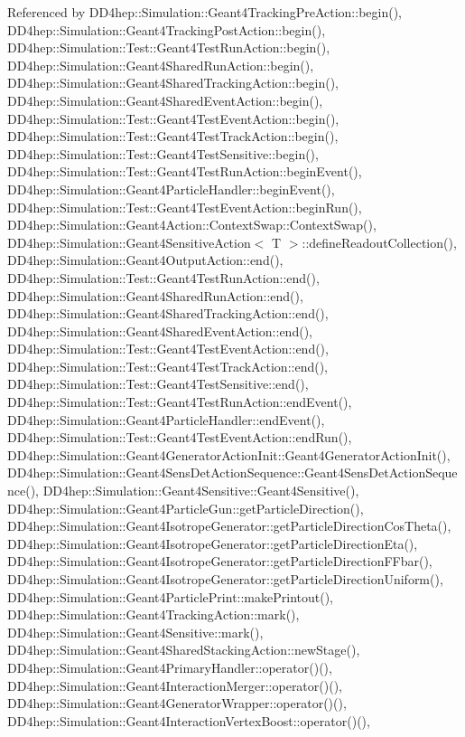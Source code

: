 Referenced by D\+D4hep\+::\+Simulation\+::\+Geant4\+Tracking\+Pre\+Action\+::begin(), D\+D4hep\+::\+Simulation\+::\+Geant4\+Tracking\+Post\+Action\+::begin(), D\+D4hep\+::\+Simulation\+::\+Test\+::\+Geant4\+Test\+Run\+Action\+::begin(), D\+D4hep\+::\+Simulation\+::\+Geant4\+Shared\+Run\+Action\+::begin(), D\+D4hep\+::\+Simulation\+::\+Geant4\+Shared\+Tracking\+Action\+::begin(), D\+D4hep\+::\+Simulation\+::\+Geant4\+Shared\+Event\+Action\+::begin(), D\+D4hep\+::\+Simulation\+::\+Test\+::\+Geant4\+Test\+Event\+Action\+::begin(), D\+D4hep\+::\+Simulation\+::\+Test\+::\+Geant4\+Test\+Track\+Action\+::begin(), D\+D4hep\+::\+Simulation\+::\+Test\+::\+Geant4\+Test\+Sensitive\+::begin(), D\+D4hep\+::\+Simulation\+::\+Test\+::\+Geant4\+Test\+Run\+Action\+::begin\+Event(), D\+D4hep\+::\+Simulation\+::\+Geant4\+Particle\+Handler\+::begin\+Event(), D\+D4hep\+::\+Simulation\+::\+Test\+::\+Geant4\+Test\+Event\+Action\+::begin\+Run(), D\+D4hep\+::\+Simulation\+::\+Geant4\+Action\+::\+Context\+Swap\+::\+Context\+Swap(), D\+D4hep\+::\+Simulation\+::\+Geant4\+Sensitive\+Action$<$ T $>$\+::define\+Readout\+Collection(), D\+D4hep\+::\+Simulation\+::\+Geant4\+Output\+Action\+::end(), D\+D4hep\+::\+Simulation\+::\+Test\+::\+Geant4\+Test\+Run\+Action\+::end(), D\+D4hep\+::\+Simulation\+::\+Geant4\+Shared\+Run\+Action\+::end(), D\+D4hep\+::\+Simulation\+::\+Geant4\+Shared\+Tracking\+Action\+::end(), D\+D4hep\+::\+Simulation\+::\+Geant4\+Shared\+Event\+Action\+::end(), D\+D4hep\+::\+Simulation\+::\+Test\+::\+Geant4\+Test\+Event\+Action\+::end(), D\+D4hep\+::\+Simulation\+::\+Test\+::\+Geant4\+Test\+Track\+Action\+::end(), D\+D4hep\+::\+Simulation\+::\+Test\+::\+Geant4\+Test\+Sensitive\+::end(), D\+D4hep\+::\+Simulation\+::\+Test\+::\+Geant4\+Test\+Run\+Action\+::end\+Event(), D\+D4hep\+::\+Simulation\+::\+Geant4\+Particle\+Handler\+::end\+Event(), D\+D4hep\+::\+Simulation\+::\+Test\+::\+Geant4\+Test\+Event\+Action\+::end\+Run(), D\+D4hep\+::\+Simulation\+::\+Geant4\+Generator\+Action\+Init\+::\+Geant4\+Generator\+Action\+Init(), D\+D4hep\+::\+Simulation\+::\+Geant4\+Sens\+Det\+Action\+Sequence\+::\+Geant4\+Sens\+Det\+Action\+Sequence(), D\+D4hep\+::\+Simulation\+::\+Geant4\+Sensitive\+::\+Geant4\+Sensitive(), D\+D4hep\+::\+Simulation\+::\+Geant4\+Particle\+Gun\+::get\+Particle\+Direction(), D\+D4hep\+::\+Simulation\+::\+Geant4\+Isotrope\+Generator\+::get\+Particle\+Direction\+Cos\+Theta(), D\+D4hep\+::\+Simulation\+::\+Geant4\+Isotrope\+Generator\+::get\+Particle\+Direction\+Eta(), D\+D4hep\+::\+Simulation\+::\+Geant4\+Isotrope\+Generator\+::get\+Particle\+Direction\+F\+Fbar(), D\+D4hep\+::\+Simulation\+::\+Geant4\+Isotrope\+Generator\+::get\+Particle\+Direction\+Uniform(), D\+D4hep\+::\+Simulation\+::\+Geant4\+Particle\+Print\+::make\+Printout(), D\+D4hep\+::\+Simulation\+::\+Geant4\+Tracking\+Action\+::mark(), D\+D4hep\+::\+Simulation\+::\+Geant4\+Sensitive\+::mark(), D\+D4hep\+::\+Simulation\+::\+Geant4\+Shared\+Stacking\+Action\+::new\+Stage(), D\+D4hep\+::\+Simulation\+::\+Geant4\+Primary\+Handler\+::operator()(), D\+D4hep\+::\+Simulation\+::\+Geant4\+Interaction\+Merger\+::operator()(), D\+D4hep\+::\+Simulation\+::\+Geant4\+Generator\+Wrapper\+::operator()(), D\+D4hep\+::\+Simulation\+::\+Geant4\+Interaction\+Vertex\+Boost\+::operator()(), 